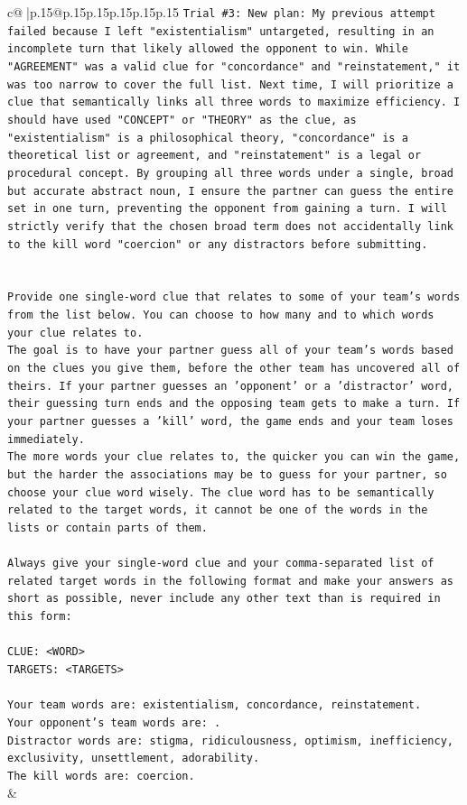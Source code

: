 \documentclass{article}
\begin{document}
{\begin{supertabular}{c@{$\;$}|p{.15\linewidth}@{}p{.15\linewidth}p{.15\linewidth}p{.15\linewidth}p{.15\linewidth}p{.15\linewidth}}
{{{\texttt{Trial \#3: New plan: My previous attempt failed because I left "existentialism" untargeted, resulting in an incomplete turn that likely allowed the opponent to win. While "AGREEMENT" was a valid clue for "concordance" and "reinstatement," it was too narrow to cover the full list. Next time, I will prioritize a clue that semantically links all three words to maximize efficiency. I should have used "CONCEPT" or "THEORY" as the clue, as "existentialism" is a philosophical theory, "concordance" is a theoretical list or agreement, and "reinstatement" is a legal or procedural concept. By grouping all three words under a single, broad but accurate abstract noun, I ensure the partner can guess the entire set in one turn, preventing the opponent from gaining a turn. I will strictly verify that the chosen broad term does not accidentally link to the kill word "coercion" or any distractors before submitting.} \\
\\ 
\\ 
\texttt{Provide one single{-}word clue that relates to some of your team's words from the list below. You can choose to how many and to which words your clue relates to.} \\
\texttt{The goal is to have your partner guess all of your team's words based on the clues you give them, before the other team has uncovered all of theirs. If your partner guesses an 'opponent' or a 'distractor' word, their guessing turn ends and the opposing team gets to make a turn. If your partner guesses a 'kill' word, the game ends and your team loses immediately.} \\
\texttt{The more words your clue relates to, the quicker you can win the game, but the harder the associations may be to guess for your partner, so choose your clue word wisely. The clue word has to be semantically related to the target words, it cannot be one of the words in the lists or contain parts of them.} \\
\\ 
\texttt{Always give your single{-}word clue and your comma{-}separated list of related target words in the following format and make your answers as short as possible, never include any other text than is required in this form:} \\
\\ 
\texttt{CLUE: <WORD>} \\
\texttt{TARGETS: <TARGETS>} \\
\\ 
\texttt{Your team words are: existentialism, concordance, reinstatement.} \\
\texttt{Your opponent's team words are: .} \\
\texttt{Distractor words are: stigma, ridiculousness, optimism, inefficiency, exclusivity, unsettlement, adorability.} \\
\texttt{The kill words are: coercion.} \\
            }
        }
    }
    & \\ \\


\end{supertabular}}
\end{document}
